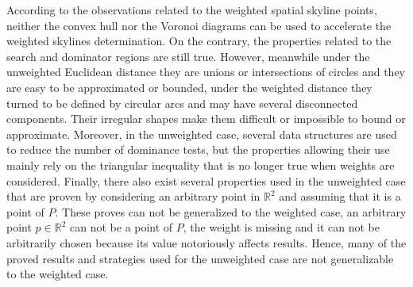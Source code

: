 \documentclass[11pt,onecolumn]{elsart3p}
\begin{document}
According to the observations related to the weighted spatial skyline points, neither the convex hull nor the Voronoi diagrams can be used to accelerate the weighted skylines determination. On the contrary, the properties related to the search and dominator regions are still true. However, meanwhile under the unweighted Euclidean distance they are unions or intersections of circles and they are easy to be approximated or bounded, under the weighted distance they turned to be defined by circular arcs and may have several disconnected components. Their irregular shapes make them difficult or impossible to bound or approximate.  Moreover, in the unweighted case, several data structures are used to reduce the number of dominance tests, but the properties allowing their use mainly rely on the triangular inequality that is no longer true when weights are considered. Finally, there also exist several properties used in the unweighted case that are proven by considering an arbitrary point in $\mathbb{R}^2$ and assuming that it is a point of $P$. These proves can not be generalized to the weighted case, an arbitrary point $p\in \mathbb{R}^2$ can not be a point of $P$, the weight is missing and it can not be arbitrarily chosen because its value notoriously affects results. Hence, many of the proved results and strategies used for the unweighted case are not generalizable to the weighted case.
\end{document}
